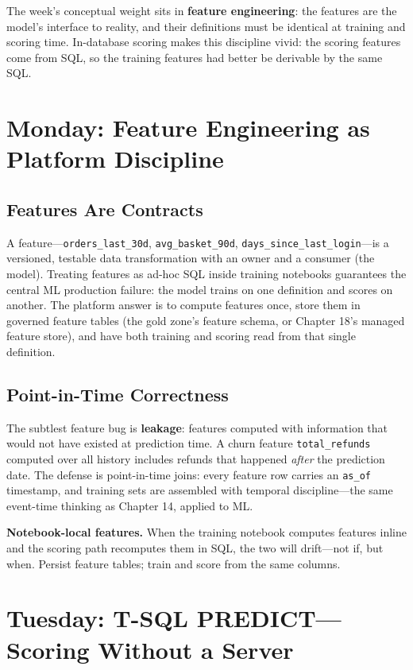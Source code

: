 The week's conceptual weight sits in \textbf{feature engineering}: the features are the model's interface to reality, and their definitions must be identical at training and scoring time. In-database scoring makes this discipline vivid: the scoring features come from SQL, so the training features had better be derivable by the same SQL.

\section{Monday: Feature Engineering as Platform Discipline}

\subsection{Features Are Contracts}
A feature---\texttt{orders\_last\_30d}, \texttt{avg\_basket\_90d}, \texttt{days\_since\_last\_login}---is a versioned, testable data transformation with an owner and a consumer (the model). Treating features as ad-hoc SQL inside training notebooks guarantees the central ML production failure: the model trains on one definition and scores on another. The platform answer is to compute features once, store them in governed feature tables (the gold zone's feature schema, or Chapter 18's managed feature store), and have both training and scoring read from that single definition.

\subsection{Point-in-Time Correctness}
The subtlest feature bug is \textbf{leakage}: features computed with information that would not have existed at prediction time. A churn feature \texttt{total\_refunds} computed over all history includes refunds that happened \emph{after} the prediction date. The defense is point-in-time joins: every feature row carries an \texttt{as\_of} timestamp, and training sets are assembled with temporal discipline---the same event-time thinking as Chapter 14, applied to ML.

\begin{pitfall}
\textbf{Notebook-local features.} When the training notebook computes features inline and the scoring path recomputes them in SQL, the two will drift---not if, but when. Persist feature tables; train and score from the same columns.
\end{pitfall}

\section{Tuesday: T-SQL PREDICT---Scoring Without a Server}

